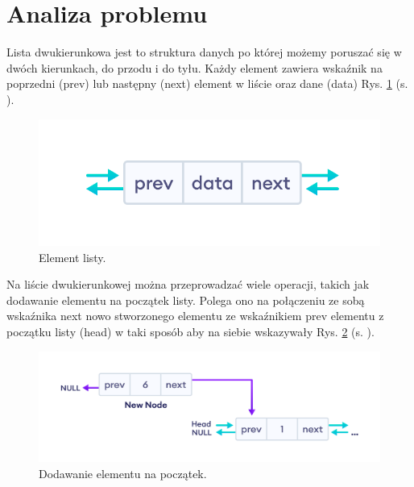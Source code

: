 \newpage
\section{Analiza problemu}		%
\hspace{0.60cm}Lista dwukierunkowa jest to struktura danych po której możemy poruszać się w dwóch kierunkach, do przodu i do tyłu. Każdy element zawiera wskaźnik na poprzedni (prev) lub następny (next) element w liście oraz dane (data) Rys. \ref{rys:rysunek001} (s. \pageref{rys:rysunek001}).

\begin{figure}[!htb]
	\begin{center}
		\includegraphics{Dokumentacja/rys/lista.png}
		\caption{Element listy.\footnotemark}
		\label{rys:rysunek001}
	\end{center}
\end{figure}


\hspace{0.60cm}Na liście dwukierunkowej można przeprowadzać wiele operacji, takich jak dodawanie elementu na początek listy. Polega ono na połączeniu ze sobą wskaźnika next nowo stworzonego elementu ze wskaźnikiem prev elementu z początku listy (head) w taki sposób aby na siebie wskazywały Rys. \ref{rys:rysunek002} (s. \pageref{rys:rysunek002}).

\begin{figure}[!htb]
	\begin{center}
		\includegraphics[scale=0.7]{Dokumentacja/rys/dodaj_na_poczatek.png}
		\caption{Dodawanie elementu na początek.}
		\label{rys:rysunek002}
	\end{center}
\end{figure}

